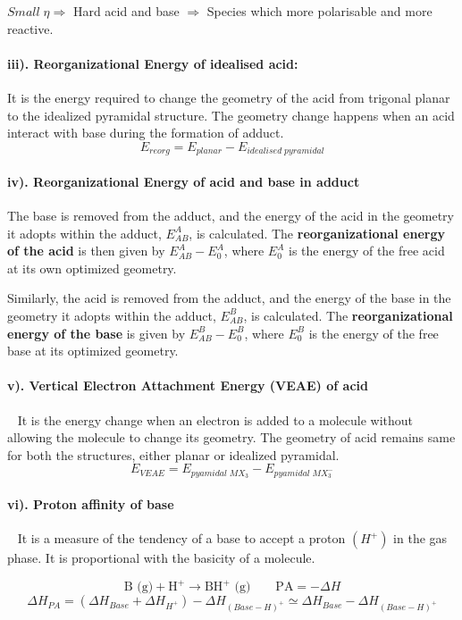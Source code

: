 $Small \; \eta \Rightarrow $  Hard acid and base $\Rightarrow$ Species which more polarisable and more reactive.

\paragraph{iii). Reorganizational Energy of idealised acid: }
It is the energy required to change the geometry of the acid from trigonal planar to the idealized pyramidal structure. The geometry change happens when an acid interact with base during the formation of adduct.
\[
E_{reorg} = E_{planar} - E_{idealised \; pyramidal}
\]


\paragraph{iv). Reorganizational Energy of acid and base in adduct}
The base is removed from the adduct, and the energy of the acid in the geometry it adopts within the adduct, \( E_{AB}^{A} \), is calculated. The \textbf{reorganizational energy of the acid} is then given by \(  E_{AB}^{A} - E_0^A \), where \( E_0^A \) is the energy of the free acid at its own optimized geometry.

Similarly, the acid is removed from the adduct, and the energy of the base in the geometry it adopts within the adduct, \( E_{AB}^{B} \), is calculated. The \textbf{reorganizational energy of the base} is given by \( E_{AB}^{B} - E_0^B \), where \( E_0^B \) is the energy of the free base at its optimized geometry.

\paragraph{v). Vertical Electron Attachment Energy (VEAE) of acid}~
It is the energy change when an electron is added to a molecule without allowing the molecule to change its geometry. The geometry of acid remains same for both the structures, either planar or idealized pyramidal.
\[
E_{VEAE} = E_{pyamidal \; MX_3 } - E_{pyamidal \; MX_3^- } 
\]

\paragraph{vi). Proton affinity of base}~
It is a measure of the tendency of a base to accept a proton $(H^+)$ in the gas phase. It is proportional with the basicity of a molecule.

\[
\text{B (g)} + \text{H}^+ \rightarrow \text{BH}^+ \text{ (g)} \qquad \text{PA} = -\Delta H
\]
\[
\Delta H_{PA} = (\Delta H_{Base} +  \Delta H_{H^{+}}) -  \Delta H_{(Base-H)^{+}} 	\simeq \Delta H_{Base} -  \Delta H_{(Base-H)^{+}}
\]

